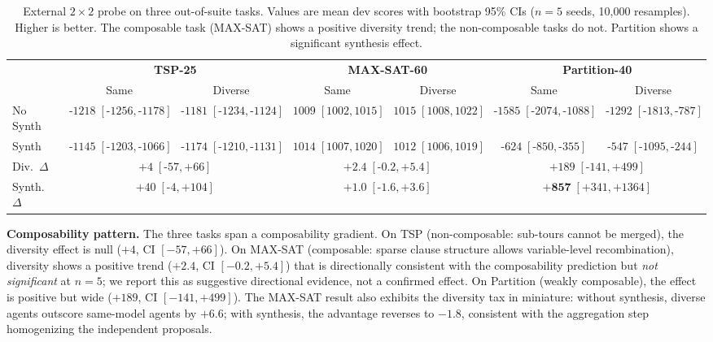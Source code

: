 \documentclass{article}
\begin{document}
\begin{table}[h]
\centering
\small
\caption{External $2{\times}2$ probe on three out-of-suite tasks. Values are mean dev scores with bootstrap 95\% CIs ($n{=}5$ seeds, 10{,}000 resamples). Higher is better. The composable task (MAX-SAT) shows a positive diversity trend; the non-composable tasks do not. Partition shows a significant synthesis effect.}
\label{tab:external}
\begin{tabular}{l cc cc cc}
\toprule
 & \multicolumn{2}{c}{\textbf{TSP-25}} & \multicolumn{2}{c}{\textbf{MAX-SAT-60}} & \multicolumn{2}{c}{\textbf{Partition-40}} \\
\cmidrule(lr){2-3}\cmidrule(lr){4-5}\cmidrule(lr){6-7}
 & Same & Diverse & Same & Diverse & Same & Diverse \\
\midrule
No Synth & $\text{-}1218\;{\scriptstyle[\text{-}1256,\text{-}1178]}$ & $\text{-}1181\;{\scriptstyle[\text{-}1234,\text{-}1124]}$ & $1009\;{\scriptstyle[1002,1015]}$ & $1015\;{\scriptstyle[1008,1022]}$ & $\text{-}1585\;{\scriptstyle[\text{-}2074,\text{-}1088]}$ & $\text{-}1292\;{\scriptstyle[\text{-}1813,\text{-}787]}$ \\
Synth    & $\text{-}1145\;{\scriptstyle[\text{-}1203,\text{-}1066]}$ & $\text{-}1174\;{\scriptstyle[\text{-}1210,\text{-}1131]}$ & $1014\;{\scriptstyle[1007,1020]}$ & $1012\;{\scriptstyle[1006,1019]}$ & $\text{-}624\;{\scriptstyle[\text{-}850,\text{-}355]}$  & $\text{-}547\;{\scriptstyle[\text{-}1095,\text{-}244]}$  \\
\midrule
Div.\ $\Delta$ & \multicolumn{2}{c}{$+4\;{\scriptstyle[\text{-}57,+66]}$} & \multicolumn{2}{c}{$+2.4\;{\scriptstyle[\text{-}0.2,+5.4]}$} & \multicolumn{2}{c}{$+189\;{\scriptstyle[\text{-}141,+499]}$} \\
Synth.\ $\Delta$ & \multicolumn{2}{c}{$+40\;{\scriptstyle[\text{-}4,+104]}$} & \multicolumn{2}{c}{$+1.0\;{\scriptstyle[\text{-}1.6,+3.6]}$} & \multicolumn{2}{c}{$\mathbf{+857}\;{\scriptstyle[+341,+1364]}$} \\
\bottomrule
\end{tabular}
\end{table}

\textbf{Composability pattern.} The three tasks span a composability gradient. On TSP (non-composable: sub-tours cannot be merged), the diversity effect is null ($+4$, CI $[-57, +66]$). On MAX-SAT (composable: sparse clause structure allows variable-level recombination), diversity shows a positive trend ($+2.4$, CI $[-0.2, +5.4]$) that is directionally consistent with the composability prediction but \emph{not significant} at $n{=}5$; we report this as suggestive directional evidence, not a confirmed effect. On Partition (weakly composable), the effect is positive but wide ($+189$, CI $[-141, +499]$). The MAX-SAT result also exhibits the diversity tax in miniature: without synthesis, diverse agents outscore same-model agents by $+6.6$; with synthesis, the advantage reverses to $-1.8$, consistent with the aggregation step homogenizing the independent proposals.
\end{document}
